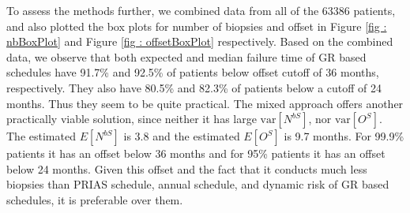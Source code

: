 To assess the methods further, we combined data from all of the 63386 patients, and also plotted the box plots for number of biopsies and offset in Figure \ref{fig : nbBoxPlot} and Figure \ref{fig : offsetBoxPlot} respectively. Based on the combined data, we observe that both expected and median failure time of GR based schedules have 91.7\% and 92.5\% of patients below offset cutoff of 36 months, respectively. They also have 80.5\% and 82.3\% of patients below a cutoff of 24 months. Thus they seem to be quite practical. The mixed approach offers another practically viable solution, since neither it has large $\mbox{var}[N^{bS}]$, nor $\mbox{var}[O^S]$. The estimated $E[N^{bS}]$ is 3.8 and the estimated $E[O^S]$ is 9.7 months. For 99.9\% patients it has an offset below 36 months and for 95\% patients it has an offset below 24 months. Given this offset and the fact that it conducts much less biopsies than PRIAS schedule, annual schedule, and dynamic risk of GR based schedules, it is preferable over them.